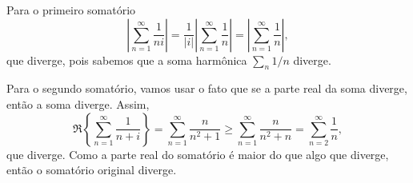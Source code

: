 
\begin{questions}

\setcounter{question}{3}
%
\begin{solution}
Para o primeiro somatório
    \[
        \left| \sum_{n=1}^\infty \frac{1}{ni} \right| =  \frac{1}{|i|} \left| \sum_{n=1}^\infty \frac{1}{n} \right| = \left| \sum_{n=1}^\infty \frac{1}{n} \right|,
    \]
    que diverge, pois sabemos que a soma harmônica $\sum_n 1/n$ diverge.
    
    Para o segundo somatório, vamos usar o fato que se a parte real da soma diverge, então a soma diverge. Assim,
    \[
        \Re\left\{\sum_{n = 1}^\infty \frac{1}{n+i}\right\} = \sum_{n = 1}^\infty \frac{n}{n^2+1} \ge \sum_{n = 1}^\infty \frac{n}{n^2+n} = \sum_{n = 2}^\infty \frac{1}{n},
    \]
    que diverge. Como a parte real do somatório é maior do que algo que diverge, então o somatório original diverge.
\end{solution}


\end{questions}
